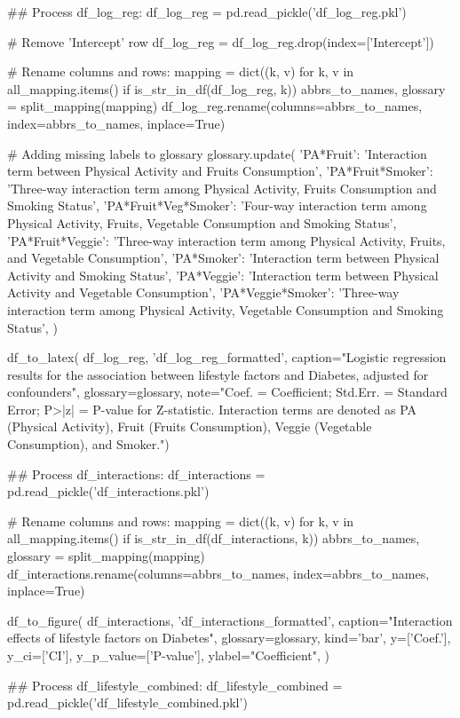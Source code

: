 \documentclass[11pt]{article}
\begin{document}
\begin{python}
## Process df_log_reg:
df_log_reg = pd.read_pickle('df_log_reg.pkl')

# Remove 'Intercept' row 
df_log_reg = df_log_reg.drop(index=['Intercept'])

# Rename columns and rows:
mapping = dict((k, v) for k, v in all_mapping.items() if is_str_in_df(df_log_reg, k))
abbrs_to_names, glossary = split_mapping(mapping)
df_log_reg.rename(columns=abbrs_to_names, index=abbrs_to_names, inplace=True)

# Adding missing labels to glossary
glossary.update({
    'PA*Fruit': 'Interaction term between Physical Activity and Fruits Consumption',
    'PA*Fruit*Smoker': 'Three-way interaction term among Physical Activity, Fruits Consumption and Smoking Status',
    'PA*Fruit*Veg*Smoker': 'Four-way interaction term among Physical Activity, Fruits, Vegetable Consumption and Smoking Status',
    'PA*Fruit*Veggie': 'Three-way interaction term among Physical Activity, Fruits, and Vegetable Consumption',
    'PA*Smoker': 'Interaction term between Physical Activity and Smoking Status',
    'PA*Veggie': 'Interaction term between Physical Activity and Vegetable Consumption',
    'PA*Veggie*Smoker': 'Three-way interaction term among Physical Activity, Vegetable Consumption and Smoking Status',
})

df_to_latex(
    df_log_reg, 'df_log_reg_formatted',
    caption="Logistic regression results for the association between lifestyle factors and Diabetes, adjusted for confounders",
    glossary=glossary,
    note="Coef. = Coefficient; Std.Err. = Standard Error; P>|z| = P-value for Z-statistic. Interaction terms are denoted as PA (Physical Activity), Fruit (Fruits Consumption), Veggie (Vegetable Consumption), and Smoker.")

## Process df_interactions:
df_interactions = pd.read_pickle('df_interactions.pkl')

# Rename columns and rows:
mapping = dict((k, v) for k, v in all_mapping.items() if is_str_in_df(df_interactions, k))
abbrs_to_names, glossary = split_mapping(mapping)
df_interactions.rename(columns=abbrs_to_names, index=abbrs_to_names, inplace=True)

df_to_figure(
    df_interactions, 'df_interactions_formatted',
    caption="Interaction effects of lifestyle factors on Diabetes", 
    glossary=glossary,
    kind='bar',
    y=['Coef.'],
    y_ci=['CI'],
    y_p_value=['P-value'],
    ylabel="Coefficient",
)

## Process df_lifestyle_combined:
df_lifestyle_combined = pd.read_pickle('df_lifestyle_combined.pkl')


\end{python}
\end{document}
